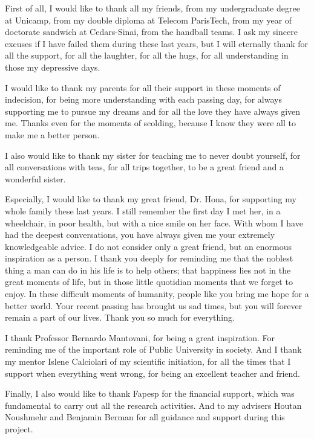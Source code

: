 

First of all, I would like to thank all my friends, from my undergraduate degree at Unicamp, from my double diploma at Telecom ParisTech, from my year of doctorate sandwich at Cedars-Sinai, from the handball teams. I ask my sincere excuses if I have failed them during these last years, but I will eternally thank for all the support, for all the laughter, for all the hugs, for all understanding in those my depressive days.

I would like to thank my parents for all their support in these moments of indecision, for being more understanding with each passing day, for always supporting me to pursue my dreams and for all the love they have always given me. Thanks even for the moments of scolding, because I know they were all to make me a better person.

I also would like to thank my sister for teaching me to never doubt yourself, for all conversations with teas, for all trips together, to be a great friend and a wonderful sister.

Especially, I would like to thank my great friend, Dr. Hona, for supporting my whole family these last years.
I still remember the first day I met her, in a wheelchair, in poor health, but with a nice smile on her face. With whom I have had the deepest conversations, you have always given me your extremely knowledgeable advice. I do not consider only a great friend, but an enormous inspiration as a person. I thank you deeply for reminding me that the noblest thing a man can do in his life is to help others; that happiness lies not in the great moments of life, but in those little quotidian moments that we forget to enjoy. In these difficult moments of humanity, people like you bring me hope for a better world. Your recent passing has brought us sad times, but you will forever remain a part of our lives. Thank you so much for everything.

 I thank Professor Bernardo Mantovani, for being a great inspiration. For reminding me of the important role of Public University in society. And I thank my mentor Islene Calciolari of my scientific initiation, for all the times that I support when everything went wrong, for being an excellent teacher and friend.

Finally, I also would like to thank Fapesp for the financial support, which was fundamental to carry out all the research activities. And to my advisers Houtan Noushmehr and Benjamin Berman for all guidance and support during this project.\\
